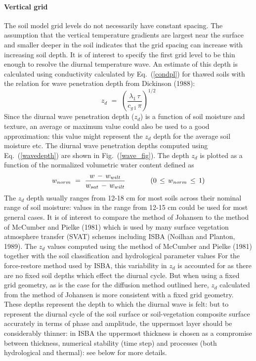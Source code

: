 \paragraph{Vertical grid}
%
The soil model grid levels do not necessarily
have constant spacing. The assumption that the 
vertical temperature gradients are largest near the surface and 
smaller deeper in the soil indicates that the grid spacing can
increase with increasing soil depth.
It is of interest to specify the first grid level
to be thin enough to resolve the diurnal temperature wave.
An estimate of this depth is calculated 
using conductivity calculated by Eq.~(\ref{condpl})
for thawed soils with the relation for wave penetration depth
from Dickinson (1988)\nocite{Dickinson1998}:
%
\begin{equation}\label{wavedepth}
z_d \,\,=\,\, {\left( \frac{\lambda_1 \,\tau}{c_{g\,1}\,\pi}\right)}^{1/2}
\end{equation}
%
Since the diurnal wave penetration depth ($z_d$) is a function
of soil moisture and texture, an
average or maximum value could also be used to a good
approximation: this value might represent the $z_d$
depth for the average soil moisture etc. 
The diurnal wave penetration
depths computed using Eq.~(\ref{wavedepth}) 
are shown in Fig.~(\ref{wave_fig}). The depth $z_d$ is
plotted as a function of the normalized volumetric water content
defined as
%
\begin{equation}\label{normwat}
w_{norm} \,\,=\,\, \frac{w\,-\,w_{wilt}}{w_{sat}\,-\,w_{wilt}}
\hskip.5in (0 \,\leq \, w_{norm} \,\leq \,1) 
\end{equation}
%
The $z_d$ depth usually
ranges from 12-18 cm for most soils across their nominal range
of soil moisture: values in the range from 12-15 cm
could be used for most general cases. 
%
It is of interest to compare the method of Johansen to 
the method of McCumber and Pielke (1981)\nocite{McCumber1981} 
which is used by many surface
vegetation atmosphere transfer (SVAT) schemes including ISBA (Noilhan
and Planton, 1989\nocite{Noilhan1989}).
The $z_d$ values computed using the method of 
McCumber and Pielke (1981)\nocite{McCumber1981}
together with the soil classification and hydrological parameter values
For the force-restore
method used by ISBA, this variability in $z_d$ is accounted for as
there are no fixed soil depths which effect the diurnal cycle.
But when using a fixed grid geometry, as is the case for the diffusion
method outlined here, $z_d$ calculated from the method of Johansen 
is more consistent with a fixed grid geometry.
%
These depths represent the depth to which the diurnal wave is felt:
but to represent the diurnal
cycle of the soil surface or soil-vegetation composite surface
accurately in terms of phase and amplitude, the uppermost layer should
be considerably thinner: in ISBA the uppermost thickness is chosen as a
compromise between thickness, numerical stability (time step) and
processes (both hydrological and thermal): see below for more details.

